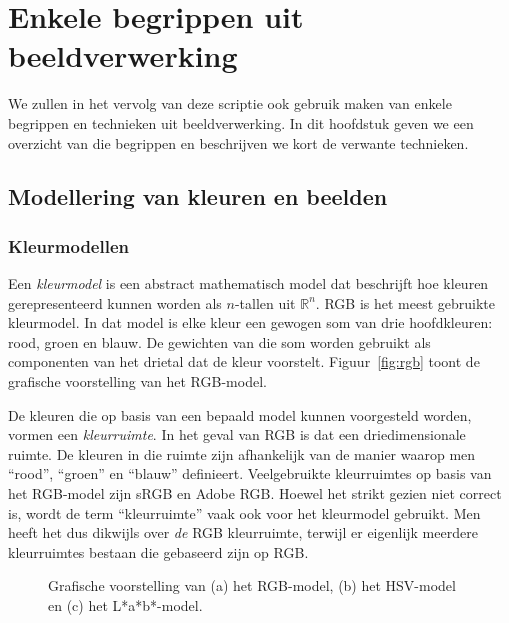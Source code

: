 \chapter{Enkele begrippen uit beeldverwerking}

We zullen in het vervolg van deze scriptie ook gebruik maken van enkele
begrippen en technieken uit beeldverwerking. In dit hoofdstuk geven we 
een overzicht van die begrippen en beschrijven we kort de verwante
technieken.

\section{Modellering van kleuren en beelden}

\subsection{Kleurmodellen}

Een \emph{kleurmodel} is een abstract mathematisch model dat beschrijft hoe kleuren gerepresenteerd 
kunnen worden als $n$-tallen uit $\mathbb{R}^n$. RGB is het meest gebruikte kleurmodel. In dat model is elke kleur
een gewogen som van drie hoofdkleuren: rood, groen en blauw. De gewichten van die som
worden gebruikt als componenten van het drietal dat de kleur voorstelt. Figuur~\ref{fig:rgb}
toont de grafische voorstelling van het RGB-model.

De kleuren die op basis van een bepaald model kunnen voorgesteld worden, vormen een \emph{kleurruimte}. 
In het geval van RGB is dat een driedimensionale ruimte. De kleuren in die ruimte zijn afhankelijk
van de manier waarop men ``rood'', ``groen'' en ``blauw'' definieert. Veelgebruikte kleurruimtes 
op basis van het RGB-model zijn sRGB en Adobe RGB.
Hoewel het strikt gezien niet correct is, wordt de term ``kleurruimte'' vaak ook voor het
kleurmodel gebruikt. Men heeft het dus dikwijls over \emph{de} RGB kleurruimte, terwijl er eigenlijk meerdere
kleurruimtes bestaan die gebaseerd zijn op RGB. 

\begin{figure}[bp]
\vspace{10pt}
\centering
{}
\qquad
{}
\qquad
{}
\caption{\label{fig:kleurmodellen}Grafische voorstelling van (a) het RGB-model, 
(b) het HSV-model en (c) het L*a*b*-model.}
\end{figure}

